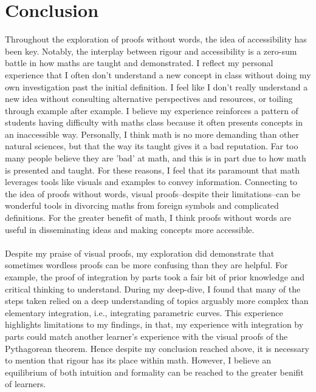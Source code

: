\documentclass[11pt,a4paper]{article}
\begin{document}
\section{Conclusion}
Throughout the exploration of proofs without words, the idea of accessibility has been key. Notably, the interplay between rigour and accessibility is a zero-sum battle in how maths are taught and demonstrated. I reflect my personal experience that I often don't understand a new concept in class without doing my own investigation past the initial definition. I feel like I don't really understand a new idea without consulting alternative perspectives and resources, or toiling through example after example. I believe my experience reinforces a pattern of students having difficulty with maths class because it often presents concepts in an inaccessible way. Personally, I think math is no more demanding than other natural sciences, but that the way its taught gives it a bad reputation. Far too many people believe they are 'bad' at math, and this is in part due to how math is presented and taught. For these reasons, I feel that its paramount that math leverages tools like visuals and examples to convey information. Connecting to the idea of proofs without words, visual proofs--despite their limitations--can be wonderful tools in divorcing maths from foreign symbols and complicated definitions. For the greater benefit of math, I think proofs without words are useful in disseminating ideas and making concepts more accessible. 
\\ \\
Despite my praise of visual proofs, my exploration did demonstrate that sometimes wordless proofs can be more confusing than they are helpful. For example, the proof of integration by parts took a fair bit of prior knowledge and critical thinking to understand. During my deep-dive, I found that many of the steps taken relied on a deep understanding of topics arguably more complex than elementary integration, i.e., integrating parametric curves. This experience highlights limitations to my findings, in that, my experience with integration by parts could match another learner's experience with the visual proofs of the Pythagorean theorem. Hence despite my conclusion reached above, it is necessary to mention that rigour has its place within math. However, I believe an equilibrium of both intuition and formality can be reached to the greater benifit of learners.
\end{document}
